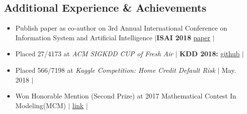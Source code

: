 \documentclass[letterpaper,10pt]{article}
\newcommand{\resumeSubHeadingListStart}{\begin{itemize}[leftmargin=*]}
\newcommand{\resumeSubHeadingListEnd}{\end{itemize}}
\newcommand{\shorterSection}[1]{\vspace{-10pt}\section{#1}}
\begin{document}
\begin{CJK*}{UTF8}{gkai}
\shorterSection{Additional Experience \& Achievements}
  \resumeSubHeadingListStart
  \small
    \item{Publish paper as co-author on 3rd Annual International Conference on Information System and Artificial Intelligence } 
    $\vert$\textbf{ISAI 2018} 
     \href{http://iopscience.iop.org/article/10.1088/1742-6596/1069/1/012095}{\color{blue}\underline{paper}} $\vert$
    \vspace{-5pt}
     \item{Placed 27/4173 at  \textit{ACM SIGKDD CUP of Fresh Air} } $\vert$
  \textbf{KDD 2018:} \href{https://github.com/wuyujack/2018-ACM-SIGKDD-CUP-of-Fresh-Air-27th-Place-Solution}{\color{blue}\underline{github}} $\vert$
    \vspace{-5pt}   
     \item{Placed 566/7198 at  \textit{Kaggle Competition: Home Credit Default Risk} }
     $\vert$ May. 2018 $\vert$
    \vspace{-5pt}    
    
    \item{Won Honorable Mention (Second Prize) at 2017 Mathematical Contest In Modeling(MCM)
    $\vert$
    \href{https://www.comap.com/undergraduate/contests/mcm/contests/2017/results/2017_ICM_Problem_D_Results.pdf}{\color{blue}\underline{link}} $\vert$
}


  \resumeSubHeadingListEnd
\end{CJK*}
\end{document}
